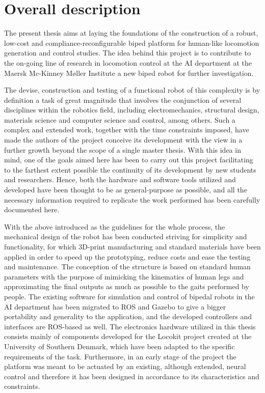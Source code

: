
\section{Overall description}
\label{sec:overall_description}
The present thesis aims at laying the foundations of the construction of a robust, low-cost and compliance-reconfigurable biped platform for human-like locomotion generation and control studies. 
The idea behind this project is to contribute to the on-going line of research in locomotion control at the AI department at the Maersk Mc-Kinney Møller Institute a new biped robot for further investigation.

The devise, construction and testing of a functional robot of this complexity is by definition a task of great magnitude that involves the conjunction of several disciplines within the robotics field, including electromechanics, structural design, materials science and computer science and control, among others.
Such a complex and extended work, together with the time constraints imposed, have made the authors of the project conceive its development with the view in a further growth beyond the scope of a single master thesis.
With this idea in mind, one of the goals aimed here has been to carry out this project facilitating to the farthest extent possible the continuity of its development by new students and researchers. 
Hence, both the hardware and software tools utilized and developed have been thought to be as general-purpose as possible, and all the necessary information required to replicate the work performed has been carefully documented here.

With the above introduced as the guidelines for the whole process, the mechanical design of the robot has been conducted striving for simplicity and functionality, for which 3D-print manufacturing and standard materials have been applied in order to speed up the prototyping, reduce costs and ease the testing and maintenance.
The conception of the structure is based on standard human parameters with the purpose of mimicking the kinematics of human legs and approximating the final outputs as much as possible to the gaits performed by people.
The existing software for simulation and control of bipedal robots in the AI department has been migrated to ROS \cite{ros} and Gazebo \cite{gazebo} to give a bigger portability and generality to the application, and the developed controllers and interfaces are ROS-based as well. 
The electronics hardware utilized in this thesis consists mainly of components developed for the Locokit project \cite{locokit} created at the University of Southern Denmark, which have been adapted to the specific requirements of the task.
Furthermore, in an early stage of the project the platform was meant to be actuated by an existing, although extended, neural control and therefore it has been designed in accordance to its characteristics and constraints.